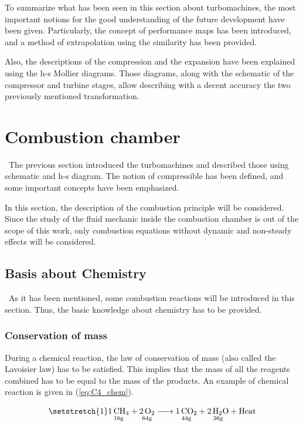 To summarize what has been seen in this section about turbomachines, the most important notions for the good understanding of the future development have been given. Particularly, the concept of performance maps has been introduced, and a method of extrapolation using the similarity has been provided.

Also, the descriptions of the compression and the expansion have been explained using the h-s Mollier diagrams. Those diagrams, along with the schematic of the compressor and turbine stages, allow describing with a decent accuracy the two previously mentioned transformation.

\newpage
\section{Combustion chamber}
\quad\ The previous section introduced the turbomachines and described those using schematic and h-s diagram. The notion of compressible has been defined, and some important concepts have been emphasized.

In this section, the description of the combustion principle will be considered. Since the study of the fluid mechanic inside the combustion chamber is out of the scope of this work, only combustion equations without dynamic and non-steady effects will be considered.

\subsection{Basis about Chemistry}
\quad\ As it has been mentioned, some combustion reactions will be introduced in this section. Thus, the basic knowledge about chemistry has to be provided.

\subsubsection{Conservation of mass}
During a chemical reaction, the law of conservation of mass (also called the Lavoisier law) has to be satisfied. This implies that the mass of all the reagents combined has to be equal to the mass of the products. An example of chemical reaction is given in (\ref{eq:C4_chem}).

\begin{equation}
    \setstretch{1}
    \underset{\mathrm{16g}}{\ce{1CH4}} \ce{+} \underset{\mathrm{64g}}{\ce{2O2}} \ce{->} \underset{\mathrm{44g}}{\ce{1CO2}} \ce{+} \underset{\mathrm{36g}}{\ce{2H2O}} \ce{+}\text{Heat}\label{eq:C4_chem}
\end{equation}

